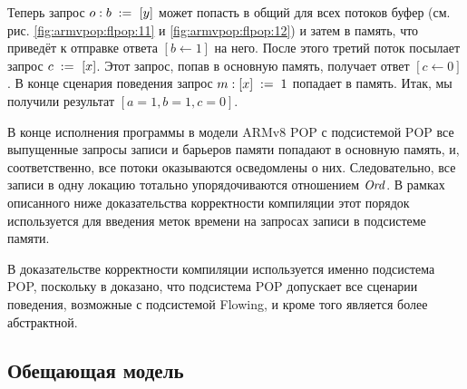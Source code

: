 Теперь запрос $o: b \;:=_{}\;[y]$ может попасть в общий для всех потоков буфер
(см. рис. \ref{fig:armvpop:flpop:11} и \ref{fig:armvpop:flpop:12}) и затем в память, что
приведёт к отправке ответа $[b \leftarrow 1]$ на него.
После этого третий поток посылает запрос $c \;:=_{}\;[x]$.
Этот запрос, попав в основную память, получает ответ $[c \leftarrow 0]$.
В конце сценария поведения запрос $m : [x]\;:=\;1$ попадает в память.
Итак, мы получили результат $[a = 1, b = 1, c = 0]$.

В конце исполнения программы в модели ARMv8 POP с подсистемой POP все выпущенные запросы записи и барьеров
памяти попадают в основную память, и, соответственно, все потоки оказываются осведомлены о них.
Следовательно, все записи в одну локацию тотально упорядочиваются отношением $\mathit{Ord}$.
В рамках описанного ниже доказательства корректности компиляции этот порядок используется для введения меток времени
на запросах записи в подсистеме памяти.

В доказательстве корректности компиляции используется именно подсистема POP,
поскольку в \cite{Flur-al:POPL16} доказано, что подсистема POP допускает все сценарии поведения,
возможные с подсистемой Flowing, и кроме того является более абстрактной.

\subsection{Обещающая модель}

